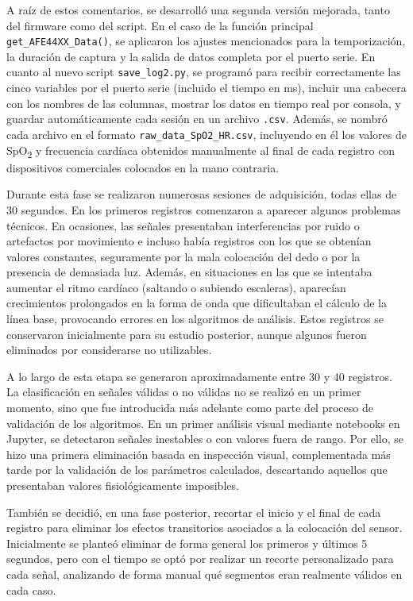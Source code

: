 A raíz de estos comentarios, se desarrolló una segunda versión mejorada, tanto del firmware como del script. En el caso de la función principal \texttt{get\_AFE44XX\_Data()}, se aplicaron los ajustes mencionados para la temporización, la duración de captura y la salida de datos completa por el puerto serie. En cuanto al nuevo script \texttt{save\_log2.py}, se programó para recibir correctamente las cinco variables por el puerto serie (incluido el tiempo en ms), incluir una cabecera con los nombres de las columnas, mostrar los datos en tiempo real por consola, y guardar automáticamente cada sesión en un archivo \texttt{.csv}. Además, se nombró cada archivo en el formato \texttt{raw\_data\_SpO2\_HR.csv}, incluyendo en él los valores de SpO\textsubscript{2} y frecuencia cardíaca obtenidos manualmente al final de cada registro con dispositivos comerciales colocados en la mano contraria.


Durante esta fase se realizaron numerosas sesiones de adquisición, todas ellas de 30 segundos. En los primeros registros comenzaron a aparecer algunos problemas técnicos. En ocasiones, las señales presentaban interferencias por ruido o artefactos por movimiento e incluso había registros con los que se obtenían valores constantes, seguramente por la mala colocación del dedo o por la presencia de demasiada luz. Además, en situaciones en las que se intentaba aumentar el ritmo cardíaco (saltando o subiendo escaleras), aparecían crecimientos prolongados en la forma de onda que dificultaban el cálculo de la línea base, provocando errores en los algoritmos de análisis. Estos registros se conservaron inicialmente para su estudio posterior, aunque algunos fueron eliminados por considerarse no utilizables.

A lo largo de esta etapa se generaron aproximadamente entre 30 y 40 registros. La clasificación en señales válidas o no válidas no se realizó en un primer momento, sino que fue introducida más adelante como parte del proceso de validación de los algoritmos. En un primer análisis visual mediante notebooks en Jupyter, se detectaron señales inestables o con valores fuera de rango. Por ello, se hizo una primera eliminación basada en inspección visual, complementada más tarde por la validación de los parámetros calculados, descartando aquellos que presentaban valores fisiológicamente imposibles.

También se decidió, en una fase posterior, recortar el inicio y el final de cada registro para eliminar los efectos transitorios asociados a la colocación del sensor. Inicialmente se planteó eliminar de forma general los primeros y últimos 5 segundos, pero con el tiempo se optó por realizar un recorte personalizado para cada señal, analizando de forma manual qué segmentos eran realmente válidos en cada caso.

